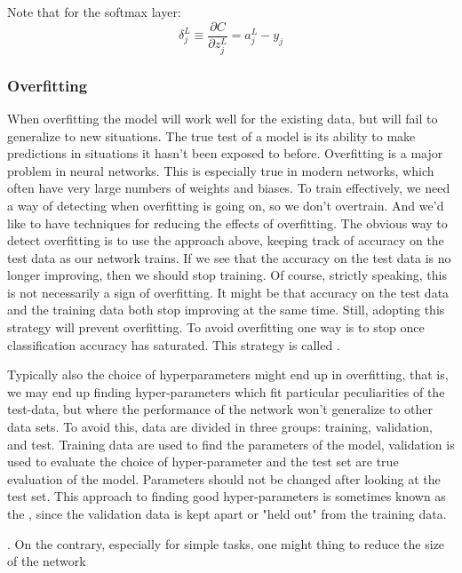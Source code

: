 Note that for the softmax layer:
\begin{equation}
\delta_j^L \equiv\frac{\partial C}{\partial z_j^L} = a_j^L-y_j 
\end{equation}

\subsubsection{Overfitting}
When overfitting the model will work well for the existing data, but will fail to generalize to new situations. The true test of a model is its ability to make predictions in situations it hasn't been exposed to before. Overfitting is a major problem in neural networks. This is especially true in modern networks, which often have very large numbers of weights and biases. To train effectively, we need a way of detecting when overfitting is going on, so we don't overtrain. And we'd like to have techniques for reducing the effects of overfitting. The obvious way to detect overfitting is to use the approach above, keeping track of accuracy on the test data as our network trains. If we see that the accuracy on the test data is no longer improving, then we should stop training. Of course, strictly speaking, this is not necessarily a sign of overfitting. It might be that accuracy on the test data and the training data both stop improving at the same time. Still, adopting this strategy will prevent overfitting. To avoid overfitting one way is to stop once classification accuracy has saturated. This strategy is called .

Typically also the choice of hyperparameters might end up in overfitting, that is, we may end up finding hyper-parameters which fit particular peculiarities of the test-data, but where the performance of the network won't generalize to other data sets. To avoid this, data are divided in three groups: training, validation, and test. Training data are used to find the parameters of the model, validation is used to evaluate the choice of hyper-parameter and the test set are true evaluation of the model. Parameters should not be changed after looking at the test set.  This approach to finding good hyper-parameters is sometimes known as the , since the validation data is kept apart or "held out" from the training data.

. On the contrary, especially for simple tasks, one might thing to reduce the size of the network

